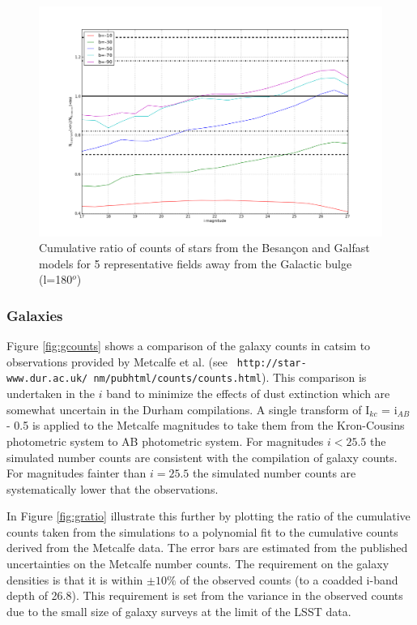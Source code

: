 \documentclass[]{article}
\begin{document}
{\begin{figure}[H]
\includegraphics[width=5in]{validation_figures/cumulative_ratio_stars_180_besancon_dust.png}
\caption{Cumulative ratio of counts of stars from the Besan\c{c}on and Galfast models for 5 representative fields away from the Galactic bulge (l=180$^o$) \label{fig:sratio_180}}
\end{figure}

\subsubsection{Galaxies \label{sec:galaxycounts}}

Figure \ref{fig:gcounts} shows a comparison of the galaxy counts in
catsim to observations provided by Metcalfe et al. (see {\tt
  http://star-www.dur.ac.uk/~nm/pubhtml/counts/counts.html}).  This
comparison is undertaken in the $i$ band to minimize the effects of
dust extinction which are somewhat uncertain in the Durham
compilations.  A single transform of I$_{kc}$ = i$_{AB}$ - 0.5 is
applied to the Metcalfe magnitudes to take them from the Kron-Cousins
photometric system to AB photometric system. For magnitudes $i<25.5$
the simulated number counts are consistent with the compilation of
galaxy counts. For magnitudes fainter than $i=25.5$ the simulated
number counts are systematically lower that the observations.

In Figure \ref{fig:gratio} illustrate this further by plotting the
ratio of the cumulative counts taken from the simulations to a
polynomial fit to the cumulative counts derived from the Metcalfe
data.  The error bars are estimated from the published uncertainties
on the Metcalfe number counts. The requirement on the galaxy densities
is that it is within $\pm10\%$ of the observed counts (to a coadded
i-band depth of 26.8). This requirement is set from the variance in
the observed counts due to the small size of galaxy surveys at the
limit of the LSST data.

}
\end{document}
